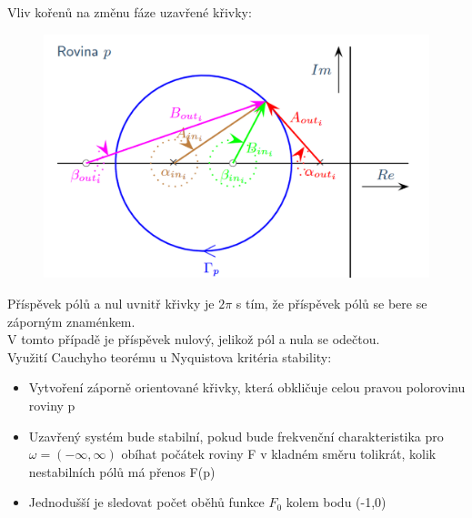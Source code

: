 Vliv kořenů na změnu fáze uzavřené křivky:
\begin{figure}[H]
    \includegraphics*[scale = 0.3]{images/NyQuistVlivKorenu.png}
\end{figure}
Příspěvek pólů a nul uvnitř křivky je $2\pi$ s tím, že příspěvek pólů se bere se záporným znaménkem.\\
V tomto případě je příspěvek nulový, jelikož pól a nula se odečtou.\\
Využití Cauchyho teorému u Nyquistova kritéria stability:\\
\begin{itemize}
    \item Vytvoření záporně orientované křivky, která obkličuje celou pravou polorovinu roviny p
    \item Uzavřený systém bude stabilní, pokud bude frekvenční charakteristika pro $\omega = (-\infty, \infty)$ obíhat počátek roviny F v kladném směru tolikrát, kolik nestabilních pólů má přenos F(p)
    \item Jednodušší je sledovat počet oběhů funkce $F_0$ kolem bodu (-1,0)
\end{itemize}

